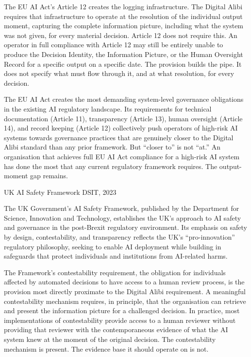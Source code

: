 The EU AI Act's Article 12 creates the logging infrastructure. The Digital Alibi requires that infrastructure to operate at the resolution of the individual output moment, capturing the complete information picture, including what the system was not given, for every material decision. Article 12 does not require this. An operator in full compliance with Article 12 may still be entirely unable to produce the Decision Identity, the Information Picture, or the Human Oversight Record for a specific output on a specific date. The provision builds the pipe. It does not specify what must flow through it, and at what resolution, for every decision.

The EU AI Act creates the most demanding system-level governance obligations in the existing AI regulatory landscape. Its requirements for technical documentation (Article 11), transparency (Article 13), human oversight (Article 14), and record keeping (Article 12) collectively push operators of high-risk AI systems towards governance practices that are genuinely closer to the Digital Alibi standard than any prior framework. But ``closer to'' is not ``at.'' An organisation that achieves full EU AI Act compliance for a high-risk AI system has done the most that any current regulatory framework requires. The output-moment gap remains.

UK AI Safety Framework DSIT, 2023

The UK Government's AI Safety Framework, published by the Department for Science, Innovation and Technology, establishes the UK's approach to AI safety and governance in the post-Brexit regulatory environment. Its emphasis on safety by design, contestability, and transparency reflects the UK's ``pro-innovation'' regulatory philosophy, seeking to enable AI deployment while building in safeguards that protect individuals and institutions from AI-related harms.

The Framework's contestability requirement, the obligation for individuals affected by automated decisions to have access to a human review process, is the provision most directly proximate to the Digital Alibi requirement. A meaningful contestability mechanism requires, in principle, that the organisation can retrieve and present the information picture for a challenged decision. In practice, most implementations of contestability provide access to a human reviewer without providing that reviewer with the contemporaneous evidence of what the AI system knew at the moment of the original decision. The contestability mechanism is present. The evidence base it should operate on is not.


